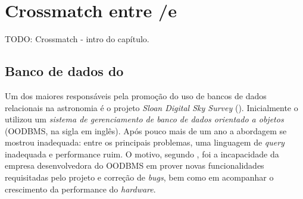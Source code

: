 


\chapter{Crossmatch entre \SDSS/\starlight e \galex}
\label{sec:Crossmatch}

TODO: Crossmatch - intro do capítulo.

\section{Banco de dados do \SDSS}
Um dos maiores responsáveis pela promoção do uso de bancos de dados relacionais
na astronomia é o projeto {\em Sloan Digital Sky Survey} (\SDSS). Inicialmente o
\SDSS utilizou um {\em sistema de gerenciamento de banco de dados orientado a
objetos} \citep{Maier1986} (OODBMS, na sigla em inglês). Após pouco mais de um
ano a abordagem se mostrou inadequada: entre os principais problemas, uma
linguagem de {\em query} inadequada e performance ruim. O motivo, segundo
\citet{Thakar2004}, foi a incapacidade da empresa desenvolvedora do OODBMS em
prover novas funcionalidades requisitadas pelo projeto e correção de {\em bugs},
bem como em acompanhar o crescimento da performance do {\em hardware}.

